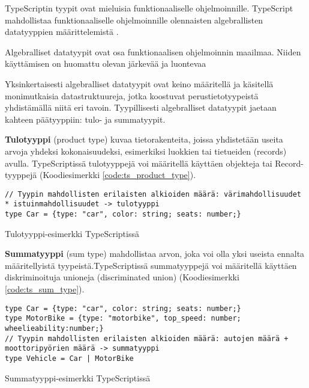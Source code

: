 TypeScriptin tyypit ovat mieluisia funktionaaliselle ohjelmoinnille. TypeScript mahdollistaa funktionaaliselle ohjelmoinnille olennaisten algebrallisten datatyyppien määrittelemistä \cite{holvikari2021category}.

Algebralliset datatyypit ovat osa funktionaalisen ohjelmoinnin maailmaa. Niiden käyttämisen on huomattu olevan järkevää ja luontevaa \cite{holvikari2021category,hickey_maybe_not,algebraic_data_types}

Yksinkertaisesti algebralliset datatyypit ovat keino määritellä ja käsitellä monimutkaisia datastruktuureja, jotka koostuvat perustietotyypeistä yhdistämällä niitä eri tavoin. Tyypillisesti algebralliset datatyypit jaetaan kahteen päätyyppiin: tulo- ja summatyypit.

\textbf{Tulotyyppi} (product type) kuvaa tietorakenteita, joissa yhdistetään useita arvoja yhdeksi kokonaisuudeksi, esimerkiksi luokkien tai tietueiden (records) avulla.
TypeScriptissä tulotyyppejä voi määritellä käyttäen objekteja tai Record-tyyppejä (Koodiesimerkki \ref{code:ts_product_type}). \citep{algebraic_data_types,holvikari2021category}

\begin{code}
    \begin{verbatim}
// Tyypin mahdollisten erilaisten alkioiden määrä: värimahdollisuudet * istuinmahdollisuudet -> tulotyyppi
type Car = {type: "car", color: string; seats: number;}
\end{verbatim}
    \caption{Tulotyyppi-esimerkki TypeScriptissä}
    \label{code:ts_product_type}
\end{code}

\textbf{Summatyyppi} (sum type) mahdollistaa arvon, joka voi olla yksi useista ennalta määritellyistä tyypeistä.TypeScriptissä summatyyppejä voi määritellä käyttäen diskriminoituja unioneja (discriminated union) (Koodiesimerkki \ref{code:ts_sum_type}). \citep{algebraic_data_types,holvikari2021category}

\begin{code}
    \begin{verbatim}
type Car = {type: "car", color: string; seats: number;}
type MotorBike = {type: "motorbike", top_speed: number; wheelieability:number;}
// Tyypin mahdollisten erilaisten alkioiden määrä: autojen määrä + moottoripyörien määrä -> summatyyppi
type Vehicle = Car | MotorBike
\end{verbatim}
    \caption{Summatyyppi-esimerkki TypeScriptissä}
    \label{code:ts_sum_type}
\end{code}


